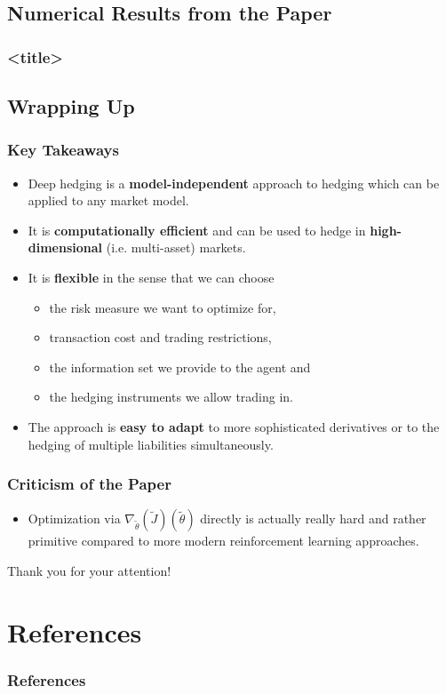 \documentclass[serif]{beamer}
\begin{document}
\subsection{Numerical Results from the Paper}

\begin{frame}
    \frametitle{<title>}
\end{frame}

\subsection{Wrapping Up}

\begin{frame}
    \frametitle{Key Takeaways}
    \begin{itemize}
        \item Deep hedging is a \textbf{model-independent} approach to hedging
              which can be applied to any market model.
        \item It is \textbf{computationally efficient} and can be used to
              hedge in \textbf{high-dimensional} (i.e. multi-asset) markets.
        \item It is \textbf{flexible} in the sense that we can choose
              \begin{itemize}
                  \item the risk measure we want to optimize for,
                  \item transaction cost and trading restrictions,
                  \item the information set we provide to the agent and
                  \item the hedging instruments we allow trading in.
              \end{itemize}
        \item The approach is \textbf{easy to adapt} to more sophisticated
              derivatives or to the hedging of multiple liabilities
              simultaneously.
    \end{itemize}
\end{frame}

\begin{frame}
    \frametitle{Criticism of the Paper}
    \begin{itemize}
        \item Optimization via
              $\nabla_{\tilde{\theta}} (\tilde{J}) (\tilde{\theta})$
              directly is actually really hard and rather primitive
              compared to more modern reinforcement learning approaches.
    \end{itemize}
\end{frame}

\begin{frame}
    \centering
    \Large{
        Thank you for your attention!
    }
\end{frame}

\section{References}
\begin{frame}
    \frametitle{References}
    
    
\end{frame}
\end{document}
